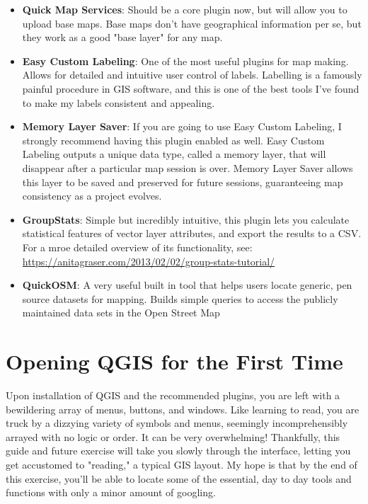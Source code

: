 \documentclass{article}
\begin{document}
\begin{itemize}
    \item \textbf{Quick Map Services}: Should be a core plugin now, but will allow you to upload base maps. Base maps don't have geographical information per se, but they work as a good "base layer" for any map.
    \item \textbf{Easy Custom Labeling}: One of the most useful plugins for map making. Allows for detailed and intuitive user control of labels. Labelling is a famously painful procedure in GIS software, and this is one of the best tools I've found to make my labels consistent and appealing.
    \item \textbf{Memory Layer Saver}: If you are going to use Easy Custom Labeling, I strongly recommend having this plugin enabled as well. Easy Custom Labeling outputs a unique data type, called a memory layer, that will disappear after a particular map session is over. Memory Layer Saver allows this layer to be saved and preserved for future sessions, guaranteeing map consistency as a project evolves.
    \item \textbf{GroupStats}: Simple but incredibly intuitive, this plugin lets you calculate statistical features of vector layer attributes, and export the results to a CSV. For a mroe detailed overview of its functionality, see: \href{https://anitagraser.com/2013/02/02/group-stats-tutorial/}{https://anitagraser.com/2013/02/02/group-stats-tutorial/}
    \item \textbf{QuickOSM}: A very useful built in tool that helps users locate generic, pen source datasets for mapping. Builds simple queries to access the publicly maintained data sets in the Open Street Map 
\end{itemize}

\section{Opening QGIS for the First Time}

Upon installation of QGIS and the recommended plugins, you are left with a bewildering array of menus, buttons, and windows. Like learning to read, you are truck by a dizzying variety of symbols and menus, seemingly incomprehensibly arrayed with no logic or order. It can be very overwhelming! Thankfully, this guide and future exercise will take you slowly through the interface, letting you get accustomed to "reading," a typical GIS layout. My hope is that by the end of this exercise, you'll be able to locate some of the essential, day to day tools and functions with only a minor amount of googling. 
\end{document}
